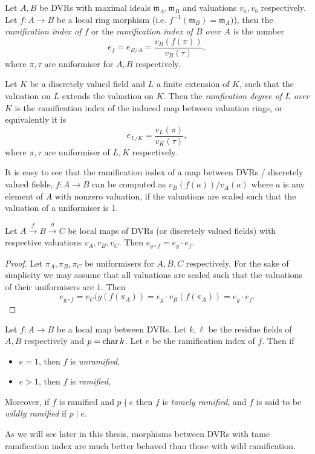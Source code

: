 \begin{definition}
	Let $A, B$ be DVRs with maximal ideals $\mathfrak{m}_A, \mathfrak{m} _B$ and valuations $v_a, v_b$ respectively.
	Let $f: A \to B$ be a local ring morphism (i.e. $f^{-1}(\mathfrak{m} _B) = \mathfrak{m} _A)$), then the \emph{ramification index of $f$} or the \emph{ramification index of $B$ over $A$} is the number \[
		e_f = e_{B / A}= \frac{v_B(f(\pi))}{v_B(\tau)}
	,\] 
	where $\pi, \tau$ are uniformiser for $A, B$ respectively. 
\end{definition}

\begin{definition}
	Let $K$ be a discretely valued field and $L$ a finite extension of $K$, such that the valuation on $L$ extends the valuation on $K$. 
	Then the \emph{ramfication degree of  $L$ over  $K$} is the ramification index of the induced map between valuation rings, or equivalently it is 
	\[
	e_{L / K}  = \frac{v_L(\pi)}{v_K(\tau)}	,\] 
	where $\pi, \tau$ are uniformiser of $L, K$ respectively. 
\end{definition}

It is easy to see that the ramification index of a map between DVRs / discretely valued fields, $f: A \to B$ can be computed as $v_B(f(a)) / v_A(a)$ where $a$ is any element of $A$ with nonzero valuation, if the valuations are scaled such that the valuation of a uniformiser is 1. 

\begin{lemma}\label{lem:multiplicative_ramification_degree}
	Let $A \xrightarrow f B \xrightarrow g C$ be local maps of DVRs (or discretely valued fields) with respective valuations $v_A, v_B, v_C$. 
	Then $e_{g \circ f} = e_g \cdot e_f$.
\end{lemma}
\begin{proof}
	Let $\pi_A, \pi_B, \pi_C$ be uniformisers for $A, B, C$ respectively. 
	For the sake of simplicity we may assume that all valuations are scaled such that the valuations of their uniformisers are $1$.  
	Then 
	\[
		e_{g \circ f} = v_C(g(f(\pi_A)) = e_g \cdot  v_B(f(\pi_A)) = e_g\cdot e_f
	.\] 
\end{proof}

\begin{definition}
	Let $f: A \to B$ be a local map between DVRs. 
	Let $k, \ell$ be the residue fields of $A, B$ respectively and $p = \operatorname{char} k$.
	Let $e$ be the ramification index of $f$.
	Then if
	\begin{itemize}
		\item $e = 1$, then $f$ is \emph{unramified}, 
		\item $e > 1$, then $f$ is \emph{ramified},
	\end{itemize}
	Moreover, if $f$ is ramified and $p \nmid e$ then $f$ is \emph{tamely ramified}, and  $f$ is said to be \emph{wildly ramified} if  $p \mid e$. 
\end{definition}
As we will see later in this thesis, morphisms between DVRs with tame ramification index are much better behaved than those with wild ramification. 

